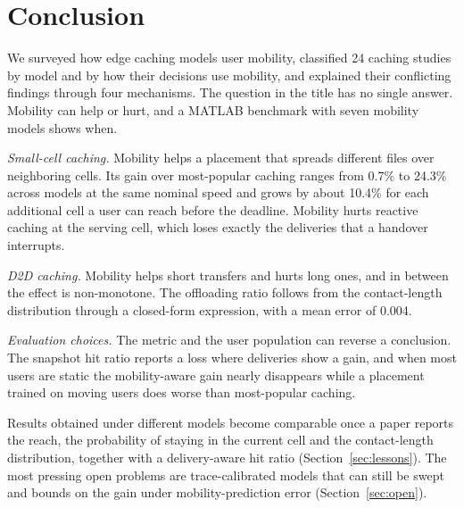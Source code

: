 
\section{Conclusion}
\label{sec:conclusion}

We surveyed how edge caching models user mobility, classified 24 caching studies by model and by how their decisions use mobility, and explained their conflicting findings through four mechanisms. The question in the title has no single answer. Mobility can help or hurt, and a MATLAB benchmark with seven mobility models shows when.

\emph{Small-cell caching.} Mobility helps a placement that spreads different files over neighboring cells. Its gain over most-popular caching ranges from 0.7\% to 24.3\% across models at the same nominal speed and grows by about 10.4\% for each additional cell a user can reach before the deadline. Mobility hurts reactive caching at the serving cell, which loses exactly the deliveries that a handover interrupts.

\emph{D2D caching.} Mobility helps short transfers and hurts long ones, and in between the effect is non-monotone. The offloading ratio follows from the contact-length distribution through a closed-form expression, with a mean error of 0.004.

\emph{Evaluation choices.} The metric and the user population can reverse a conclusion. The snapshot hit ratio reports a loss where deliveries show a gain, and when most users are static the mobility-aware gain nearly disappears while a placement trained on moving users does worse than most-popular caching.

Results obtained under different models become comparable once a paper reports the reach, the probability of staying in the current cell and the contact-length distribution, together with a delivery-aware hit ratio (Section~\ref{sec:lessons}). The most pressing open problems are trace-calibrated models that can still be swept and bounds on the gain under mobility-prediction error (Section~\ref{sec:open}).
